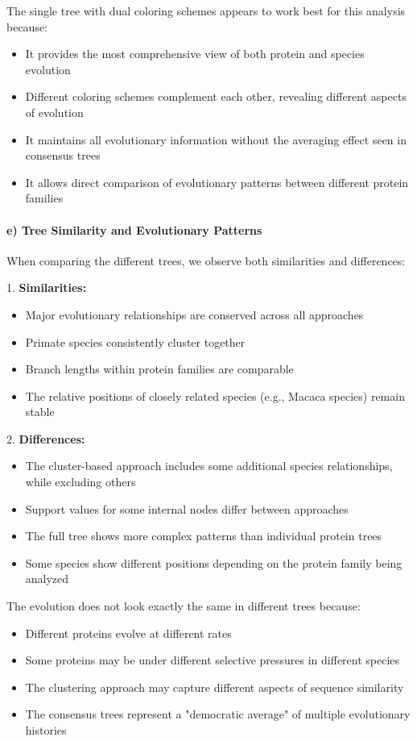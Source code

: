 \documentclass[11pt, a4paper, hidelinks]{article}
\begin{document}
The single tree with dual coloring schemes appears to work best for this analysis because:
\begin{itemize}
    \item It provides the most comprehensive view of both protein and species evolution
    \item Different coloring schemes complement each other, revealing different aspects of evolution
    \item It maintains all evolutionary information without the averaging effect seen in consensus trees
    \item It allows direct comparison of evolutionary patterns between different protein families
\end{itemize}

\paragraph{e) Tree Similarity and Evolutionary Patterns}

When comparing the different trees, we observe both similarities and differences:

1. \textbf{Similarities:}
\begin{itemize}
    \item Major evolutionary relationships are conserved across all approaches
    \item Primate species consistently cluster together
    \item Branch lengths within protein families are comparable
    \item The relative positions of closely related species (e.g., Macaca species) remain stable
\end{itemize}

2. \textbf{Differences:}
\begin{itemize}
    \item The cluster-based approach includes some additional species relationships, while excluding others
    \item Support values for some internal nodes differ between approaches
    \item The full tree shows more complex patterns than individual protein trees
    \item Some species show different positions depending on the protein family being analyzed
\end{itemize}

The evolution does not look exactly the same in different trees because:
\begin{itemize}
    \item Different proteins evolve at different rates
    \item Some proteins may be under different selective pressures in different species
    \item The clustering approach may capture different aspects of sequence similarity
    \item The consensus trees represent a "democratic average" of multiple evolutionary histories
\end{itemize}
\end{document}

